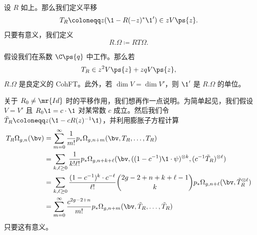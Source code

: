 \begin{defn}
    设 $R$ 如上。那么我们定义平移
    \[ T_R \coloneqq z (\1 - R(-z)^* \1') \in z V\ps{z}. \]
    只要有意义，我们定义
    \[ R.\Omega \coloneqq RT\Omega. \]
\end{defn}

\begin{thm}
    假设我们在系数 $\C\ps{q}$ 中工作。那么若
    \[ T_R \in z^2 V \ps{z} + zq V \ps{z}, \]
    $R.\Omega$ 是良定义的 CohFT。此外，若 $\dim V = \dim V'$，则 $\1'$ 是 $R.\Omega$ 的单位。
\end{thm}

关于 $R_0 \neq \mr{Id}$ 时的平移作用，我们想再作一点说明。为简单起见，我们假设 $V = V'$ 且 $R_0 \1 = c \cdot \1$ 对某常数 $c$ 成立。然后我们令 $\tilde{T}_R \coloneqq z( \1 - c R(z)^{-1} \1)$，并利用膨胀子方程计算
\begin{align*}
    T_R \Omega_{g,n}(\bv) &= \sum_{m=0}^{\infty} \frac{1}{m!} p_*\Omega_{g,n+m}(\bv, T_R, \ldots, T_R) \\
    &= \sum_{k,\ell \geq 0} \frac{1}{k!\ell!} p_* \Omega_{g,n+k+\ell}(\bv, ( (1-c^{-1})\1 \cdot \psi )^{\otimes k}, ( c^{-1} \tilde{T}_R )^{\otimes \ell}) \\
    &= \sum_{k,\ell \geq 0} \frac{(1-c^{-1})^k \cdot c^{-\ell}}{\ell!} \binom{2g-2+n+k+\ell-1}{k} p_* \Omega_{g,n+\ell}(\bv, \tilde{T}_R^{\otimes \ell}) \\
    &= \sum_{m=0}^{\infty} \frac{c^{2g-2+n}}{m!} p_* \Omega_{g,n+m}(\bv, \tilde{T}_R, \ldots, \tilde{T}_R)
\end{align*}
只要这有意义。


